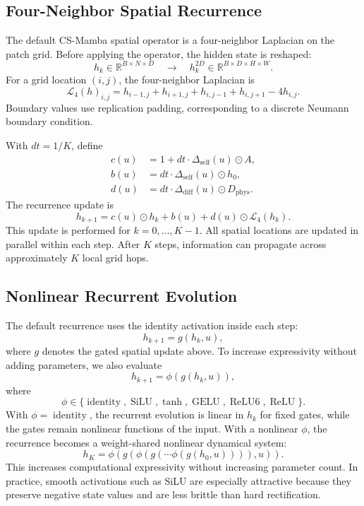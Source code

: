 \documentclass[11pt]{article}
\newcommand{\csm}{CS-Mamba}
\newcommand{\R}{\mathbb{R}}
\newcommand{\Lap}{\mathcal{L}}
\begin{document}
\subsection{Four-Neighbor Spatial Recurrence}

The default \csm{} spatial operator is a four-neighbor Laplacian on the patch grid.
Before applying the operator, the hidden state is reshaped:
\[
    h_k \in \R^{B \times N \times D}
    \quad\rightarrow\quad
    h_k^{2D} \in \R^{B \times D \times H \times W}.
\]
For a grid location $(i,j)$, the four-neighbor Laplacian is
\[
    \Lap_4(h)_{i,j}
    =
    h_{i-1,j} + h_{i+1,j} + h_{i,j-1} + h_{i,j+1} - 4h_{i,j}.
\]
Boundary values use replication padding, corresponding to a discrete Neumann
boundary condition.

With $dt=1/K$, define
\begin{align}
    c(u) &= 1 + dt \cdot \Delta_{\mathrm{self}}(u) \odot A, \\
    b(u) &= dt \cdot \Delta_{\mathrm{self}}(u) \odot h_0, \\
    d(u) &= dt \cdot \Delta_{\mathrm{diff}}(u) \odot D_{\mathrm{phys}}.
\end{align}
The recurrence update is
\[
    h_{k+1}
    =
    c(u) \odot h_k
    + b(u)
    + d(u) \odot \Lap_4(h_k).
\]
This update is performed for $k=0,\ldots,K-1$. All spatial locations are updated
in parallel within each step. After $K$ steps, information can propagate across
approximately $K$ local grid hops.

\subsection{Nonlinear Recurrent Evolution}

The default recurrence uses the identity activation inside each step:
\[
    h_{k+1} = g(h_k,u),
\]
where $g$ denotes the gated spatial update above. To increase expressivity without
adding parameters, we also evaluate
\[
    h_{k+1} = \phi(g(h_k,u)),
\]
where
\[
    \phi \in
    \{\operatorname{identity}, \operatorname{SiLU}, \tanh, \operatorname{GELU},
      \operatorname{ReLU6}, \operatorname{ReLU}\}.
\]
With $\phi=\operatorname{identity}$, the recurrent evolution is linear in $h_k$
for fixed gates, while the gates remain nonlinear functions of the input. With a
nonlinear $\phi$, the recurrence becomes a weight-shared nonlinear dynamical system:
\[
    h_K = \phi\!\left(g\left(\phi\!\left(g(\cdots \phi(g(h_0,u)) )\right),u\right)\right).
\]
This increases computational expressivity without increasing parameter count. In
practice, smooth activations such as SiLU are especially attractive because they
preserve negative state values and are less brittle than hard rectification.
\end{document}
